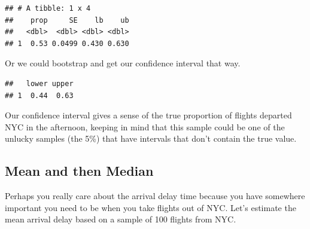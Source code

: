 \documentclass[]{book}
\newenvironment{Shaded}{\begin{snugshade}}{\end{snugshade}}
\newcommand{\CommentTok}[1]{\textcolor[rgb]{0.56,0.35,0.01}{\textit{#1}}}
\newcommand{\DataTypeTok}[1]{\textcolor[rgb]{0.13,0.29,0.53}{#1}}
\newcommand{\DecValTok}[1]{\textcolor[rgb]{0.00,0.00,0.81}{#1}}
\newcommand{\FloatTok}[1]{\textcolor[rgb]{0.00,0.00,0.81}{#1}}
\newcommand{\KeywordTok}[1]{\textcolor[rgb]{0.13,0.29,0.53}{\textbf{#1}}}
\newcommand{\NormalTok}[1]{#1}
\newcommand{\OperatorTok}[1]{\textcolor[rgb]{0.81,0.36,0.00}{\textbf{#1}}}
\newcommand{\OtherTok}[1]{\textcolor[rgb]{0.56,0.35,0.01}{#1}}
\newcommand{\StringTok}[1]{\textcolor[rgb]{0.31,0.60,0.02}{#1}}
\begin{document}
\begin{verbatim}
## # A tibble: 1 x 4
##    prop     SE    lb    ub
##   <dbl>  <dbl> <dbl> <dbl>
## 1  0.53 0.0499 0.430 0.630
\end{verbatim}

Or we could bootstrap and get our confidence interval that way.

\begin{Shaded}
\end{Shaded}

\begin{verbatim}
##   lower upper
## 1  0.44  0.63
\end{verbatim}

Our confidence interval gives a sense of the true proportion of flights departed NYC in the afternoon, keeping in mind that this sample could be one of the unlucky samples (the 5\%) that have intervals that don't contain the true value.

\hypertarget{mean-and-then-median}{%
\subsection{Mean and then Median}\label{mean-and-then-median}}

Perhaps you really care about the arrival delay time because you have somewhere important you need to be when you take flights out of NYC. Let's estimate the mean arrival delay based on a sample of 100 flights from NYC.
\end{document}
